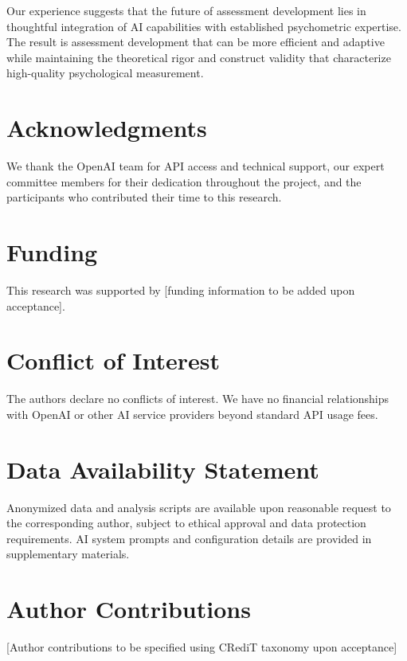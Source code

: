 \documentclass[12pt,a4paper]{article}
\begin{document}
Our experience suggests that the future of assessment development lies in thoughtful integration of AI capabilities with established psychometric expertise. The result is assessment development that can be more efficient and adaptive while maintaining the theoretical rigor and construct validity that characterize high-quality psychological measurement.

\section{Acknowledgments}

We thank the OpenAI team for API access and technical support, our expert committee members for their dedication throughout the project, and the participants who contributed their time to this research.

\section{Funding}

This research was supported by [funding information to be added upon acceptance].

\section{Conflict of Interest}

The authors declare no conflicts of interest. We have no financial relationships with OpenAI or other AI service providers beyond standard API usage fees.

\section{Data Availability Statement}

Anonymized data and analysis scripts are available upon reasonable request to the corresponding author, subject to ethical approval and data protection requirements. AI system prompts and configuration details are provided in supplementary materials.

\section{Author Contributions}

[Author contributions to be specified using CRediT taxonomy upon acceptance]

\newpage



\end{document}
